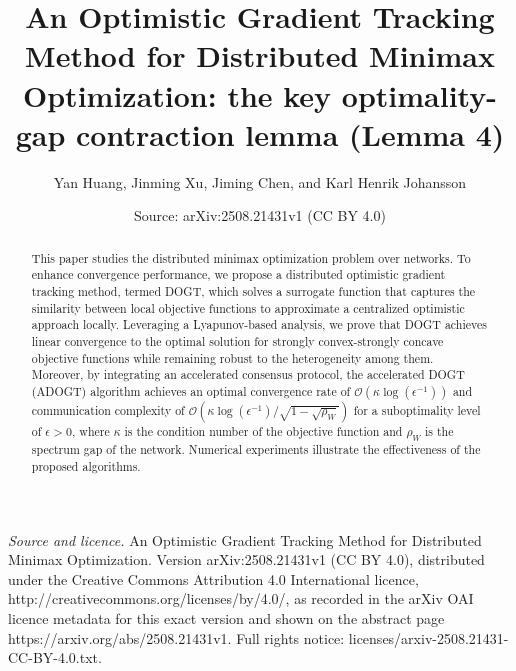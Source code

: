 \documentclass[10pt,a4paper]{amsart}
\title[An Optimistic Gradient Tracking Method for Distributed Minimax Optimization]{An Optimistic Gradient Tracking Method for Distributed Minimax Optimization: the key optimality-gap contraction lemma (Lemma 4)}
\author{Yan Huang, Jinming Xu, Jiming Chen, and Karl Henrik Johansson}
\date{Source: arXiv:2508.21431v1 (CC BY 4.0)}
\begin{document}
\begin{abstract}
This paper studies the distributed minimax optimization problem over networks. To enhance convergence performance, we propose a distributed optimistic gradient tracking method, termed DOGT, which solves a surrogate function that captures the similarity between local objective functions to approximate a centralized optimistic approach locally. Leveraging a Lyapunov-based analysis, we prove that DOGT achieves linear convergence to the optimal solution for strongly convex-strongly concave objective functions while remaining robust to the heterogeneity among them. Moreover, by integrating an accelerated consensus protocol, the accelerated DOGT (ADOGT) algorithm achieves an optimal convergence rate of  $\mathcal{O} \left( \kappa \log \left( \epsilon ^{-1} \right) \right) $ and communication complexity of $\mathcal{O} \left( \kappa \log \left( \epsilon ^{-1} \right) /\sqrt{1-\sqrt{\rho _W}} \right)$ for a suboptimality level of $\epsilon>0$, where $\kappa$ is the condition number of the objective function and $\rho_W$ is the spectrum gap of the network. Numerical experiments illustrate the effectiveness of the proposed algorithms.
\end{abstract}
\maketitle
\noindent\emph{Source and licence.} An Optimistic Gradient Tracking Method for Distributed Minimax Optimization. Version arXiv:2508.21431v1 (CC BY 4.0), distributed under the Creative Commons Attribution 4.0 International licence, http://creativecommons.org/licenses/by/4.0/, as recorded in the arXiv OAI licence metadata for this exact version and shown on the abstract page https://arxiv.org/abs/2508.21431v1. Full rights notice: licenses/arxiv-2508.21431-CC-BY-4.0.txt.\par\smallskip
\end{document}
